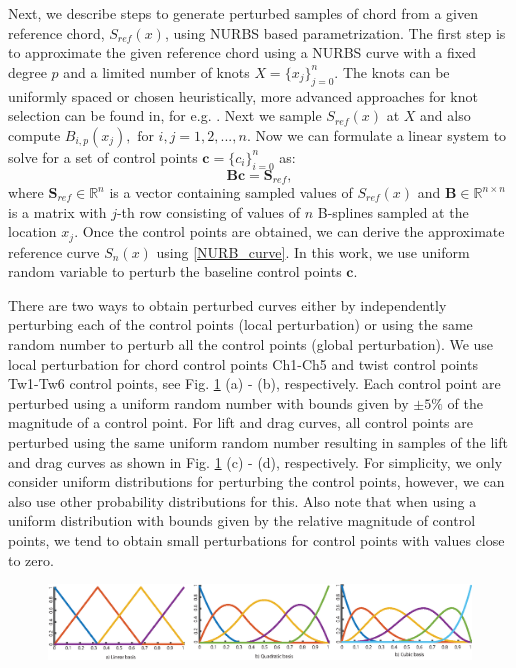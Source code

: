 \documentclass[review]{elsarticle}
\numberwithin{equation}{section}
\numberwithin{equation}{section}
\begin{document}
Next, we describe steps to generate perturbed samples of chord from a given reference chord, $S_{ref}(x)$, using NURBS based parametrization. The first step is to approximate the given reference chord using a NURBS curve with a fixed degree $p$ and a limited number of knots $X =\{x_j\}_{j=0}^n$. The knots can be uniformly spaced or chosen heuristically, more advanced approaches for knot selection can be found in, for e.g. \cite{LI200579,razdan1999knot}. Next we sample $S_{ref}(x)$ at $X$ and also compute $B_{i,p}(x_j), \text{ for }i, j = 1,2, ..., n$. Now we can formulate a linear system to solve for a set of control points $\mathbf{c}=\{c_i\}_{i=0}^n$ as:
\begin{equation}\label{nurbs_inversion}
\mathbf{B}\mathbf{c} = \mathbf{S}_{ref},
\end{equation}
where $\mathbf{S}_{ref}\in\mathbb{R}^{n}$ is a vector containing sampled values of $S_{ref}(x)$ and $\mathbf{B}\in \mathbb{R}^{n\times n}$ is a matrix with $j$-th row consisting of values of $n$ B-splines sampled at the location $x_j$. Once the control points are obtained, we can derive the approximate reference curve $S_n(x)$ using \eqref{NURB_curve}. In this work, we use uniform random variable to perturb the baseline control points $\mathbf{c}$.
 
There are two ways to obtain perturbed curves either by independently perturbing each of the control points (local perturbation) or using the same random number to perturb all the control points (global perturbation). We use local perturbation for chord control points Ch1-Ch5 and twist control points Tw1-Tw6 control points, see Fig. \ref{perturbed_samples} (a) - (b), respectively. Each control point are perturbed using a uniform random number with bounds given by $\pm5\%$ of the magnitude of a control point. For lift and drag curves, all control points are perturbed using the same uniform random number resulting in samples of the lift and drag curves as shown in Fig. \ref{perturbed_samples} (c) - (d), respectively. For simplicity, we only consider uniform distributions for perturbing the control points, however, we can also use other probability distributions for this. Also note that when using a uniform distribution with bounds given by the relative magnitude of control points, we tend to obtain small perturbations for control points with values close to zero.
\begin{figure}[h!]
\centering
\includegraphics[trim={0 0cm 0 0cm},clip, scale=.75]{basis_example.eps}
\caption{}
\label{perturbed_samples}
\end{figure}
\end{document}
